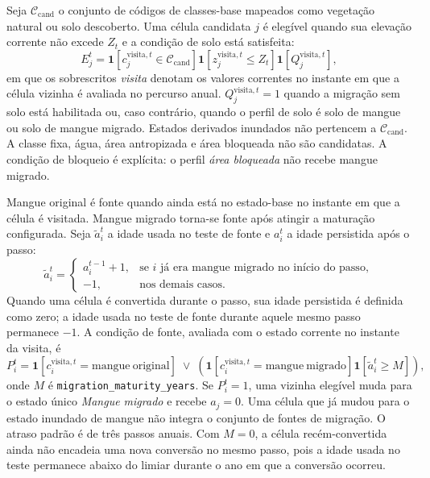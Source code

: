 \documentclass[11pt,a4paper]{article}
\begin{document}
Seja $\mathcal{C}_{\mathrm{cand}}$ o conjunto de códigos de classes-base mapeados como vegetação natural ou solo descoberto. Uma célula candidata $j$ é elegível quando sua elevação corrente não excede $Z_t$ e a condição de solo está satisfeita:
\begin{equation}
E_j^t=
\mathbf{1}[c_j^{\mathrm{visita},t}\in\mathcal{C}_{\mathrm{cand}}]
\mathbf{1}[z_j^{\mathrm{visita},t}\leq Z_t]
\mathbf{1}[Q_j^{\mathrm{visita},t}],
\label{eq:migration-eligibility}
\end{equation}
em que os sobrescritos \textit{visita} denotam os valores correntes no instante em que a célula vizinha é avaliada no percurso anual. $Q_j^{\mathrm{visita},t}=1$ quando a migração sem solo está habilitada ou, caso contrário, quando o perfil de solo é solo de mangue ou solo de mangue migrado. Estados derivados inundados não pertencem a $\mathcal{C}_{\mathrm{cand}}$. A classe fixa, água, área antropizada e área bloqueada não são candidatas. A condição de bloqueio é explícita: o perfil \textit{área bloqueada} não recebe mangue migrado.

Mangue original é fonte quando ainda está no estado-base no instante em que a célula é visitada. Mangue migrado torna-se fonte após atingir a maturação configurada. Seja $\tilde a_i^t$ a idade usada no teste de fonte e $a_i^t$ a idade persistida após o passo:
\begin{equation}
\tilde a_i^t=
\begin{cases}
 a_i^{t-1}+1, & \text{se } i \text{ já era mangue migrado no início do passo},\\
 -1, & \text{nos demais casos}.
\end{cases}
\label{eq:maturity-counter}
\end{equation}
Quando uma célula é convertida durante o passo, sua idade persistida é definida como zero; a idade usada no teste de fonte durante aquele mesmo passo permanece $-1$. A condição de fonte, avaliada com o estado corrente no instante da visita, é
\begin{equation}
P_i^t=\mathbf{1}[c_i^{\mathrm{visita},t}=\mathrm{mangue\ original}]
\;\lor\;
\left(\mathbf{1}[c_i^{\mathrm{visita},t}=\mathrm{mangue\ migrado}]
\mathbf{1}[\tilde a_i^t\geq M]\right),
\label{eq:migration-source}
\end{equation}
onde $M$ é \texttt{migration\_maturity\_years}. Se $P_i^t=1$, uma vizinha elegível muda para o estado único \textit{Mangue migrado} e recebe $a_j=0$. Uma célula que já mudou para o estado inundado de mangue não integra o conjunto de fontes de migração. O atraso padrão é de três passos anuais. Com $M=0$, a célula recém-convertida ainda não encadeia uma nova conversão no mesmo passo, pois a idade usada no teste permanece abaixo do limiar durante o ano em que a conversão ocorreu.
\end{document}
